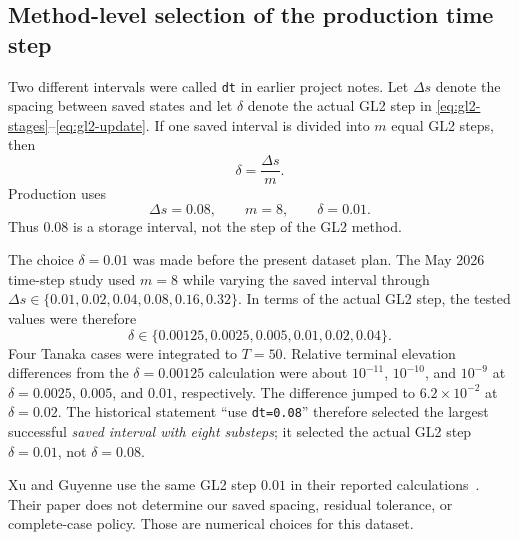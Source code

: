 \documentclass[11pt]{article}
\begin{document}
\subsection{Method-level selection of the production time step}

Two different intervals were called \texttt{dt} in earlier project notes.
Let $\Delta s$ denote the spacing between saved states and let $\delta$ denote
the actual GL2 step in \eqref{eq:gl2-stages}--\eqref{eq:gl2-update}.  If one
saved interval is divided into $m$ equal GL2 steps, then
\begin{equation}
  \delta=\frac{\Delta s}{m}.
  \label{eq:inner-gl2-step}
\end{equation}
Production uses
\begin{equation}
  \Delta s=0.08,\qquad m=8,\qquad \delta=0.01.
  \label{eq:production-gl2-step}
\end{equation}
Thus $0.08$ is a storage interval, not the step of the GL2 method.

The choice $\delta=0.01$ was made before the present dataset plan.  The May
2026 time-step study used $m=8$ while varying the saved interval through
$\Delta s\in\{0.01,0.02,0.04,0.08,0.16,0.32\}$.  In terms of the actual GL2
step, the tested values were therefore
\[
  \delta\in\{0.00125,0.0025,0.005,0.01,0.02,0.04\}.
\]
Four Tanaka cases were integrated to $T=50$.  Relative terminal elevation
differences from the $\delta=0.00125$ calculation were about $10^{-11}$,
$10^{-10}$, and $10^{-9}$ at $\delta=0.0025$, $0.005$, and $0.01$,
respectively.  The difference jumped to $6.2\times10^{-2}$ at
$\delta=0.02$.  The historical statement ``use \texttt{dt=0.08}'' therefore
selected the largest successful \emph{saved interval with eight substeps};
it selected the actual GL2 step $\delta=0.01$, not $\delta=0.08$.

Xu and Guyenne use the same GL2 step $0.01$ in their reported
calculations~\cite{xu2009}.  Their paper does not determine our saved spacing,
residual tolerance, or complete-case policy.  Those are numerical choices
for this dataset.
\end{document}
